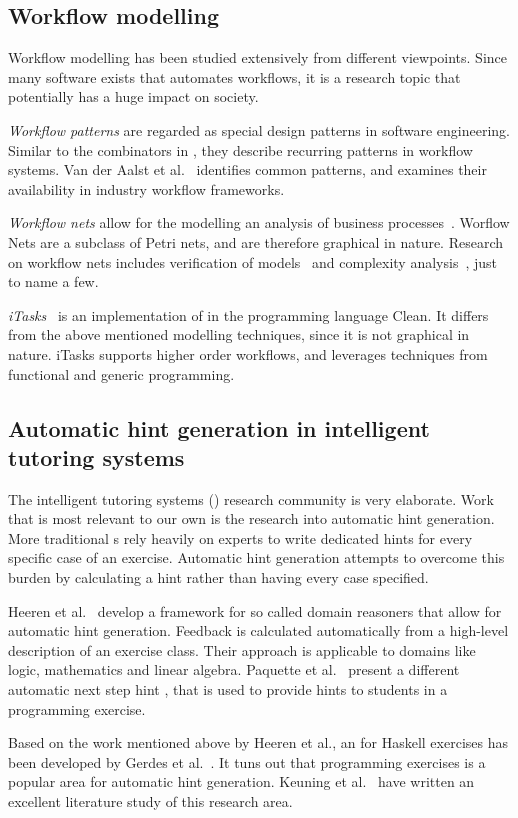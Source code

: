 \subsection{Workflow modelling}

Workflow modelling has been studied extensively from different viewpoints.
Since many software exists that automates workflows, it is a research topic that potentially has a huge impact on society.

\emph{Workflow patterns} are regarded as special design patterns in software engineering.
Similar to the combinators in \TOP, they describe recurring patterns in workflow systems.
Van der Aalst et al.~\cite{journals/dpd/AalstHKB03} identifies common patterns, and examines their availability in industry workflow frameworks.

\emph{Workflow nets} allow for the modelling an analysis of business processes~\cite{DBLP:journals/jcsc/Aalst98}.
Worflow Nets are a subclass of Petri nets, and are therefore graphical in nature.
Research on workflow nets includes verification of models~\cite{DBLP:conf/apn/Aalst97} and complexity analysis~\cite{DBLP:journals/infsof/LassenA09}, just to name a few.

\emph{iTasks}~\cite{DBLP:conf/ppdp/PlasmeijerLMAK12} is an implementation of \TOP in the programming language Clean.
It differs from the above mentioned modelling techniques, since it is not graphical in nature.
iTasks supports higher order workflows, and leverages techniques from functional and generic programming.


\subsection{Automatic hint generation in intelligent tutoring systems}

The intelligent tutoring systems (\ITS) research community is very elaborate.
Work that is most relevant to our own is the research into automatic hint generation.
More traditional \ITS{}s rely heavily on experts to write dedicated hints for every specific case of an exercise.
Automatic hint generation attempts to overcome this burden by calculating a hint rather than having every case specified.

Heeren et al.~\cite{DBLP:journals/scp/HeerenJ14} develop a framework for so called domain reasoners that allow for automatic hint generation.
Feedback is calculated automatically from a high-level description of an exercise class.
Their approach is applicable to domains like logic, mathematics and linear algebra.
Paquette et al.~\cite{DBLP:conf/its/PaquetteLBM12} present a different automatic next step hint \ITS, that is used to provide hints to students in a programming exercise.

Based on the work mentioned above by Heeren et al., an \ITS for Haskell exercises has been developed by Gerdes et al.~\cite{DBLP:journals/aiedu/GerdesHJB17}.
It tuns out that programming exercises is a popular area for automatic hint generation.
Keuning et al.~\cite{DBLP:journals/jeric/KeuningJH19} have written an excellent literature study of this research area.
